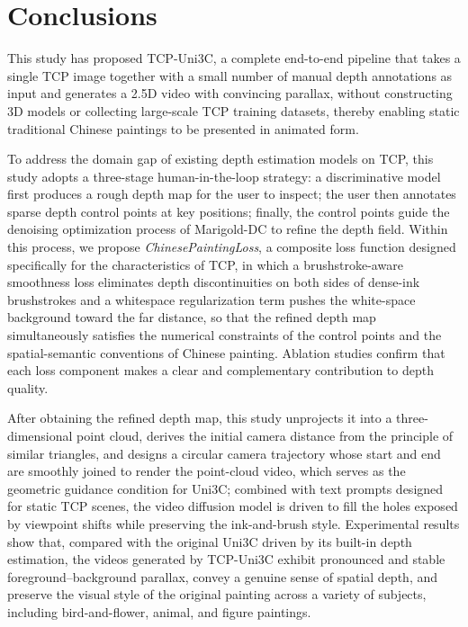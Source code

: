 \hspace{24pt}

\section{Conclusions}

This study has proposed TCP-Uni3C, a complete end-to-end pipeline that takes a single TCP image together with a small number of manual depth annotations as input
and generates a 2.5D video with convincing parallax,
without constructing 3D models or collecting large-scale TCP training datasets,
thereby enabling static traditional Chinese paintings to be presented in animated form.

To address the domain gap of existing depth estimation models on TCP,
this study adopts a three-stage human-in-the-loop strategy:
a discriminative model first produces a rough depth map for the user to inspect;
the user then annotates sparse depth control points at key positions;
finally, the control points guide the denoising optimization process of Marigold-DC to refine the depth field.
Within this process, we propose \textit{ChinesePaintingLoss}, a composite loss function designed specifically for the characteristics of TCP,
in which a brushstroke-aware smoothness loss eliminates depth discontinuities on both sides of dense-ink brushstrokes
and a whitespace regularization term pushes the white-space background toward the far distance,
so that the refined depth map simultaneously satisfies the numerical constraints of the control points and the spatial-semantic conventions of Chinese painting.
Ablation studies confirm that each loss component makes a clear and complementary contribution to depth quality.

After obtaining the refined depth map,
this study unprojects it into a three-dimensional point cloud,
derives the initial camera distance from the principle of similar triangles,
and designs a circular camera trajectory whose start and end are smoothly joined to render the point-cloud video,
which serves as the geometric guidance condition for Uni3C;
combined with text prompts designed for static TCP scenes,
the video diffusion model is driven to fill the holes exposed by viewpoint shifts while preserving the ink-and-brush style.
Experimental results show that,
compared with the original Uni3C driven by its built-in depth estimation,
the videos generated by TCP-Uni3C exhibit pronounced and stable foreground--background parallax,
convey a genuine sense of spatial depth,
and preserve the visual style of the original painting across a variety of subjects, including bird-and-flower, animal, and figure paintings.

